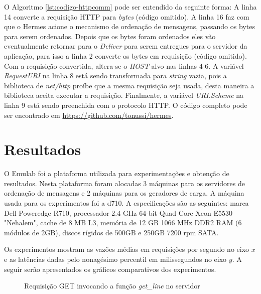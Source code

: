 \documentclass[12pt]{article}
\begin{document}
\begin{minipage}{\textwidth}
\begin{center}

\end{center}
\end{minipage}

O Algoritmo \ref{lst:codigo-httpcomm} pode ser entendido da seguinte forma: A linha 14 converte a requisição {HTTP} para \textit{bytes} (código omitido). A linha 16 faz com que o Hermes acione o mecanismo de ordenação de mensagens, passando os bytes para serem ordenados. Depois que os bytes foram ordenados eles vão eventualmente retornar para o \textit{Deliver} para serem entregues para o servidor da aplicação, para isso a linha 2 converte os bytes em requisição (código omitido). Com a requisição convertida, altera-se o \textit{HOST} alvo nas linhas 4-6. A variável \textit{RequestURI} na linha 8 está sendo transformada para \textit{string} vazia, pois a biblioteca de \textit{net/http} proíbe que a mesma requisição seja usada, desta maneira a biblioteca aceita executar a requisição. Finalmente, a variável \textit{URI.Scheme} na linha 9 está sendo preenchida com o protocolo {HTTP}. O código completo pode ser encontrado em \url{https://github.com/tonussi/hermes}.

\section{Resultados} \label{sec:res}

O Emulab foi a plataforma utilizada para experimentações e obtenção de resultados. Nesta plataforma foram alocadas 3 máquinas para os servidores de ordenação de mensagens e 2 máquinas para os geradores de carga. A máquina usada para os experimentos foi a d710. A especificações são as seguintes: marca Dell Poweredge R710, processador 2.4 GHz 64-bit Quad Core Xeon E5530 "Nehalem", cache de 8 MB L3, memória de 12 GB 1066 MHz DDR2 RAM (6 módulos de 2GB), discos rígidos de 500GB e 250GB 7200 rpm SATA.


Os experimentos mostram as vazões médias em requisições por segundo no eixo $x$ e as latências dadas pelo nonagésimo percentil em milissegundos no eixo $y$. A seguir serão apresentados os gráficos comparativos dos experimentos.

\begin{figure}[htb!]
\centering
\caption{Requisição GET invocando a função \textit{get\_line} no servidor}

\label{fig:get-line}
\end{figure}
\end{document}
